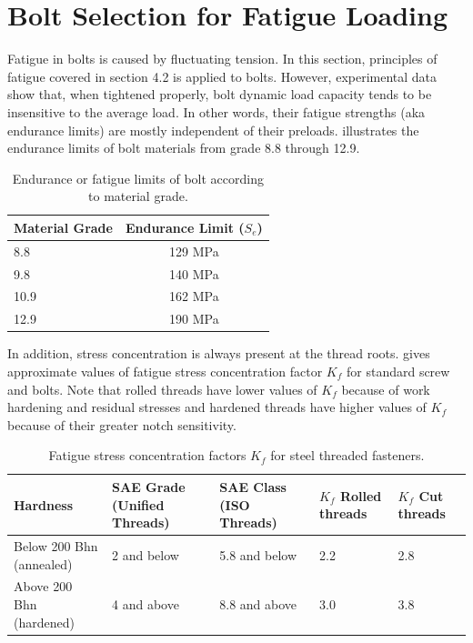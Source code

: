 \documentclass[
10pt,
a4paper,
openany,
svgnames,
]{book}
\begin{document}
\section{Bolt Selection for Fatigue Loading}

Fatigue in bolts is caused by fluctuating tension. In this section, principles of fatigue covered in section 4.2 is applied to bolts. However, experimental data show that, when tightened properly, bolt dynamic load capacity tends to be insensitive to the average load. In other words, their fatigue strengths (aka endurance limits) are mostly independent of their preloads.  illustrates the endurance limits of bolt materials from grade 8.8 through 12.9.

\begin{table}[h]
  \centering
  \caption{Endurance or fatigue limits of bolt according to material grade.}
  \label{table: fatigue limit bolt}
    \begin{tabular}{ lc }
      \toprule
      Material Grade & Endurance Limit ($S_e$) \\
      \midrule
      8.8 & 129 MPa \\
      9.8 & 140 MPa \\
      10.9 & 162 MPa \\
      12.9 & 190 MPa \\
      \bottomrule
  \end{tabular}
\end{table}

In addition, stress concentration is always present at the thread roots.  gives approximate values of fatigue stress concentration factor $K_f$ for standard screw and bolts. Note that rolled threads have lower values of $K_f$ because of work hardening and residual stresses and hardened threads have higher values of $K_f$ because of their greater notch sensitivity.

\begin{table}[h]
  \centering
  \caption{Fatigue stress concentration factors $K_f$ for steel threaded fasteners.}
  \label{table: fatigue stress concentration bolt}
    \begin{tabular}{ L{3cm} C{3cm} C{2.5cm} C{2.5cm} C{2.5cm} }
      \toprule
      Hardness & SAE Grade (Unified Threads) & SAE Class (ISO Threads) & $K_f$ Rolled threads & $K_f$ Cut threads \\
      \midrule
      Below 200 Bhn (annealed) & 2 and below & 5.8 and below & 2.2 & 2.8 \\
      Above 200 Bhn (hardened) & 4 and above & 8.8 and above & 3.0 & 3.8 \\
      \bottomrule
  \end{tabular}
\end{table}
\end{document}
